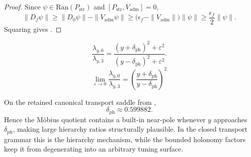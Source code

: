 \begin{proof}
Since $\psi\in\mathrm{Ran}(P_{\mathrm{str}})$ and $[P_{\mathrm{str}},V_{\mathrm{adm}}]=0$,
\[
\|D_f\psi\|
\ge
\|D_0\psi\|-\|V_{\mathrm{adm}}\psi\|
\ge
\bigl(\epsilon_f-\|V_{\mathrm{adm}}\|\bigr)\|\psi\|
\ge
\frac{\epsilon_f}{2}\|\psi\|.
\]
Squaring gives .
\end{proof}

\begin{equation}
\label{eq:mobius-quotient}
\frac{\lambda_{y,0}}{\lambda_{y,3}}
=
\frac{(y+\delta_{\mathrm{ph}})^2+\varepsilon^2}{(y-\delta_{\mathrm{ph}})^2+\varepsilon^2}.
\end{equation}
\[
\lim_{\varepsilon\to 0}\frac{\lambda_{y,0}}{\lambda_{y,3}}
=
\left(\frac{y+\delta_{\mathrm{ph}}}{y-\delta_{\mathrm{ph}}}\right)^2
\]
\begin{remark}
On the retained canonical transport saddle from ,
\[
\delta_{\mathrm{ph}}\approx \num{0.599882}.
\]
Hence the Möbius quotient contains a built-in near-pole whenever $y$ approaches $\delta_{\mathrm{ph}}$, making large hierarchy ratios structurally plausible. In the closed transport grammar this is the hierarchy mechanism, while the bounded holonomy factors keep it from degenerating into an arbitrary tuning surface.
\end{remark}

